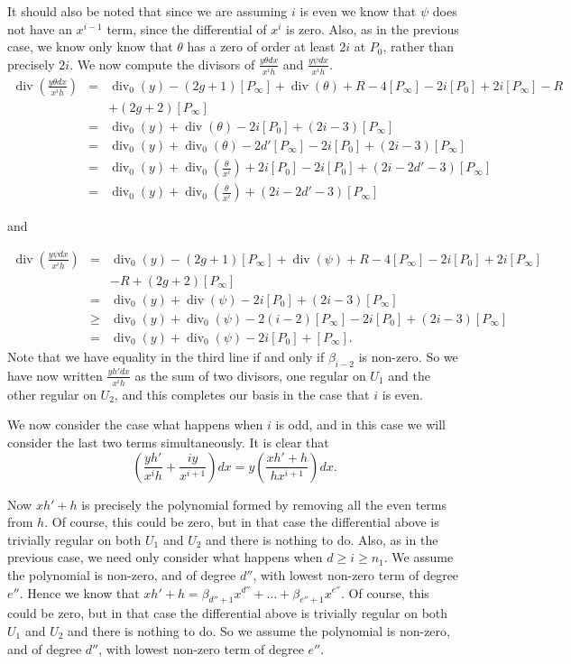 \documentclass[draft, 11pt]{article} %
\theoremstyle{plain}
\theoremstyle{remark}
\DeclareMathOperator{\di}{div}
\begin{document}
It should also be noted that since we are assuming $i$ is even we know that $\psi$ does not have an $x^{i-1}$ term, since the differential of $x^i$ is zero.
Also, as in the previous case, we know only know that $\theta$ has a zero of order at least $2i$ at $P_0$, rather than precisely $2i$.
We now compute the divisors of $\frac{y\theta dx}{x^ih}$ and $\frac{y\psi dx}{x^ih}$. 
\begin{eqnarray*}
\di\left(\frac{y\theta dx}{x^ih}\right) & = & \di_0(y) - (2g+1)[P_\infty] + \di(\theta) + R - 4[P_\infty] -2i[P_0] + 2i[P_\infty] - R \\
& &  + (2g+2)[P_\infty] \\
& = & \di_0(y) + \di(\theta) -2i[P_0] + (2i -3)[P_\infty] \\
& = & \di_0(y) + \di_0(\theta) - 2d'[P_\infty] - 2i[P_0] + (2i-3)[P_\infty] \\
& = & \di_0(y) + \di_0\left(\frac{\theta}{x^i}\right) + 2i[P_0] -2i[P_0] + (2i-2d'-3)[P_\infty]\\
& = & \di_0(y) + \di_0\left(\frac{\theta}{x^i} \right) + (2i-2d'-3)[P_\infty]
\end{eqnarray*}

and

\begin{eqnarray*}
\di\left( \frac{y\psi dx}{x^ih} \right) & = & \di_0(y) - (2g+1)[P_\infty] + \di(\psi) + R - 4[P_\infty] - 2i[P_0] + 2i[P_\infty] \\
& & - R + (2g+2)[P_\infty] \\
& = & \di_0(y) + \di(\psi) -2i[P_0] + (2i-3)[P_\infty] \\
& \geq & \di_0(y) + \di_0(\psi) - 2(i-2)[P_\infty] - 2i[P_0] + (2i-3)[P_\infty] \\
& = & \di_0(y) + \di_0(\psi) -2i[P_0] + [P_\infty].
\end{eqnarray*}
Note that we have equality in the third line if and only if $\beta_{i-2}$ is non-zero.
So we have now written $\frac{yh'dx}{x^ih}$ as the sum of two divisors, one regular on $U_1$ and the other regular on $U_2$, and this completes our basis in the case that $i$ is even.




We now consider the case what happens when $i$ is odd, and in this case we will consider the last two terms simultaneously.
It is clear that
\[
\left( \frac{yh'}{x^ih} + \frac{iy}{x^{i+1}} \right) dx  =  y \left( \frac{xh' + h}{hx^{i+1}} \right) dx.
\]

Now $xh' + h$ is precisely the polynomial formed by removing all the even terms from $h$.
Of course, this could be zero, but in that case the differential above is trivially regular on both $U_1$ and $U_2$ and there is nothing to do.
Also, as in the previous case, we need only consider what happens when $d \geq i \geq n_1$.
We assume the polynomial is non-zero, and of degree $d''$, with lowest non-zero term of degree $e''$.
Hence we know that $xh' + h = \beta_{d''+1} x^{d''} + \ldots + \beta_{e''+1}x^{e''}$.
Of course, this could be zero, but in that case the differential above is trivially regular on both $U_1$ and $U_2$ and there is nothing to do.
So we assume the polynomial is non-zero, and of degree $d''$, with lowest non-zero term of degree $e''$.
\end{document}
